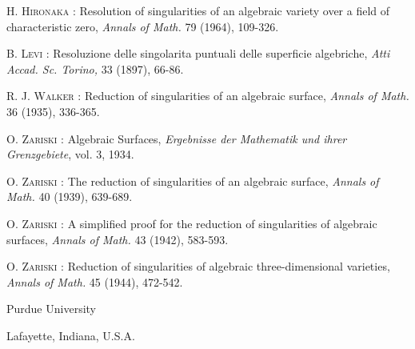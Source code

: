 \begin{thebibliography}{99}
 \textsc{H. Hironaka :} Resolution of singularities of an algebraic variety over a field of characteristic zero, {\em Annals of Math.} 79 (1964), 109-326.

 \textsc{B. Levi :} Resoluzione delle singolarita puntuali delle superficie algebriche, {\em Atti Accad. Sc. Torino,} 33 (1897), 66-86.

 \textsc{R. J. Walker :} Reduction of singularities of an algebraic surface, {\em Annals of Math.} 36 (1935), 336-365.

 \textsc{O. Zariski :} Algebraic Surfaces, {\em Ergebnisse der Mathematik und ihrer Grenzgebiete}, vol. 3, 1934.

 \textsc{O. Zariski :} The reduction of singularities of an algebraic surface, {\em Annals of Math.} 40 (1939), 639-689.

 \textsc{O. Zariski :} A simplified proof for the reduction of singularities of algebraic surfaces, {\em Annals of Math.} 43 (1942), 583-593.

 \textsc{O. Zariski :} Reduction of singularities of algebraic three-dimensional varieties, {\em Annals of Math.} 45 (1944), 472-542.
\end{thebibliography}

\medskip
\noindent
Purdue University

\noindent
Lafayette, Indiana, U.S.A.


